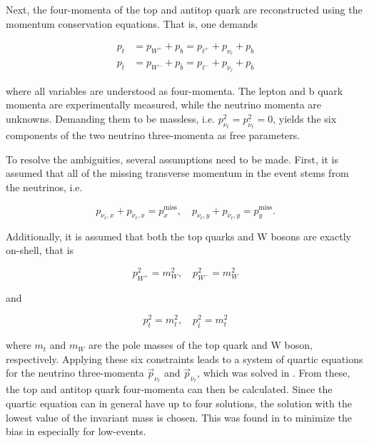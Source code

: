 Next, the four-momenta of the top and antitop quark are reconstructed using the momentum conservation equations. That is, one demands

\begin{equation}
\begin{split}
    p_t &= p_{W^+} + p_{b} = p_{\ell^+} + p_{\nu_{\ell}} + p_{b} \\
    p_{\bar{t}} &= p_{W^-} + p_{\bar{b}} = p_{\ell^-} + p_{\bar{\nu}_{\ell}} + p_{\bar{b}}
\end{split}
\end{equation}

\noindent where all variables are understood as four-momenta. The lepton and b quark momenta are experimentally measured, while the neutrino momenta are unknowns. Demanding them to be massless, i.e. $p_{\nu_{\ell}}^2 = p_{\bar{\nu}_{\ell}}^2 = 0$, yields the six components of the two neutrino three-momenta as free parameters.

To resolve the ambiguities, several assumptions need to be made. First, it is assumed that all of the missing transverse momentum in the event stems from the neutrinos, i.e.

\begin{equation}
    p_{\nu_{\ell},x} + p_{\bar{\nu}_{\ell},x} = p_{x}^{\mathrm{miss}} , \quad p_{\nu_{\ell},y} + p_{\bar{\nu}_{\ell},y} = p_{y}^{\mathrm{miss}} .
\end{equation}

Additionally, it is assumed that both the top quarks and W bosons are exactly on-shell, that is

\begin{equation}
    p_{W^+}^2 = m_W^2 , \quad p_{W^-}^2 = m_W^2
\end{equation}

\noindent and

\begin{equation}
    p_{t}^2 = m_t^2 , \quad p_{\bar{t}}^2 = m_t^2
\end{equation}

\noindent where $m_t$ and $m_W$ are the pole masses of the top quark and W boson, respectively. Applying these six constraints leads to a system of quartic equations for the neutrino three-momenta $\vec{p}_{\nu_{\ell}}$ and $\vec{p}_{\bar{\nu}_{\ell}}$, which was solved in . From these, the top and antitop quark four-momenta can then be calculated. Since the quartic equation can in general have up to four solutions, the solution with the lowest value of the invariant \ttbar mass \mtt is chosen. This was found in  to minimize the bias in \mtt especially for low-\mtt events.

